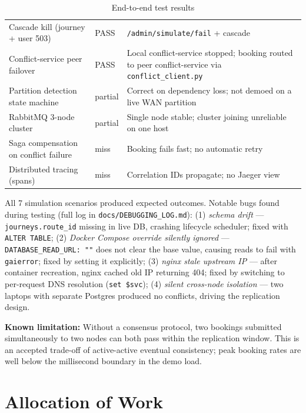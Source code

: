 \documentclass[11pt,a4paper]{article}
\begin{document}
\begin{table}[H]
\begin{tabularx}{\textwidth}{L{4.8cm} L{1.2cm} X}
  Cascade kill (journey + user 503)        & PASS & \texttt{/admin/simulate/fail} + cascade \\
  Conflict-service peer failover           & PASS & Local conflict-service stopped; booking routed to peer conflict-service via \texttt{conflict\_client.py} \\
  Partition detection state machine        & partial & Correct on dependency loss; not demoed on a live WAN partition \\
  RabbitMQ 3-node cluster                  & partial & Single node stable; cluster joining unreliable on one host \\
  Saga compensation on conflict failure    & miss    & Booking fails fast; no automatic retry \\
  Distributed tracing (spans)              & miss    & Correlation IDs propagate; no Jaeger view \\
  \bottomrule
\end{tabularx}
\caption{End-to-end test results}
\label{tab:results}
\end{table}

All 7 simulation scenarios produced expected outcomes. Notable bugs found during testing (full log in \texttt{docs/DEBUGGING\_LOG.md}): (1) \emph{schema drift} — \texttt{journeys.route\_id} missing in live DB, crashing lifecycle scheduler; fixed with \texttt{ALTER TABLE}; (2) \emph{Docker Compose override silently ignored} — \texttt{DATABASE\_READ\_URL: ""} does not clear the base value, causing reads to fail with \texttt{gaierror}; fixed by setting it explicitly; (3) \emph{nginx stale upstream IP} — after container recreation, nginx cached old IP returning 404; fixed by switching to per-request DNS resolution (\texttt{set \$svc}); (4) \emph{silent cross-node isolation} — two laptops with separate Postgres produced no conflicts, driving the replication design.

\textbf{Known limitation:} Without a consensus protocol, two bookings submitted simultaneously to two nodes can both pass within the replication window. This is an accepted trade-off of active-active eventual consistency; peak booking rates are well below the millisecond boundary in the demo load.

\section{Allocation of Work}
\label{sec:allocation}
\end{document}
